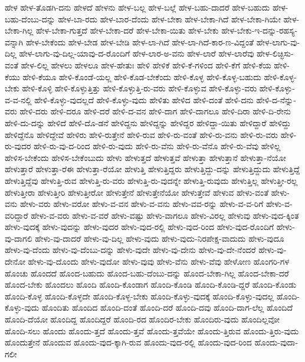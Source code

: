 {ಹೇಳ
ಹೇಳ-ತೊಡಗಿ-ದನು
ಹೇಳದೆ
ಹೇಳನು
ಹೇಳ-ಬಲ್ಲ
ಹೇಳ-ಬಲ್ಲೆ
ಹೇಳ-ಬಹು-ದಾದರೆ
ಹೇಳ-ಬಹುದು
ಹೇಳ-ಬಹು-ದೆಂಬು-ದನ್ನು
ಹೇಳ-ಬಾ-ರದು
ಹೇಳ-ಬಾರ-ದೆಂದು
ಹೇಳ-ಬೇಕಾ
ಹೇಳ-ಬೇಕಾ-ಗಿದೆ
ಹೇಳ-ಬೇಕಾ-ಗಿಯೇ
ಹೇಳ-ಬೇಕಾ-ಗಿಲ್ಲ
ಹೇಳ-ಬೇಕಾ-ಗುತ್ತದೆ
ಹೇಳ-ಬೇಕಾ-ದರೆ
ಹೇಳ-ಬೇಕಾ-ಯಿತು
ಹೇಳ-ಬೇಕು
ಹೇಳ-ಬೇಕು-ಇ-ದನ್ನು-ರಹಸ್ಯ-ವನ್ನಾಗಿ
ಹೇಳ-ಬೇಕೆಂದು
ಹೇಳ-ಬೇಡ
ಹೇಳ-ಬೇಡಿ
ಹೇಳ-ಲಾ-ಗಿದೆ
ಹೇಳ-ಲಾ-ಗಿದೆ-ಕಾರ-ಣ-ವಿದ್ದಂತೆ
ಹೇಳ-ಲಾಗು-ವು-ದಿಲ್ಲ
ಹೇಳ-ಲಾಗು-ವು-ದಿಲ್ಲ-ಯಾವು-ದ-ರೊಂದಿಗೆ
ಹೇಳ-ಲಾರ-ಅ-ವನು
ಹೇಳ-ಲಾರೆ
ಹೇಳ-ಲಾರೆವು
ಹೇಳ-ಲಿಚ್ಛಿಸು-ವಂತೆ
ಹೇಳ-ಲಿಲ್ಲ
ಹೇಳಲು
ಹೇಳಲೂ
ಹೇಳ-ಹೇತುಃ
ಹೇಳಿ
ಹೇಳಿಕೆ
ಹೇಳಿ-ಕೆ-ಗಳಿಂದ
ಹೇಳಿ-ಕೆಗೆ
ಹೇಳಿ-ಕೆಯ
ಹೇಳಿ-ಕೆಯು
ಹೇಳಿ-ಕೆಯೂ
ಹೇಳಿ-ಕೊಂಡೆ-ಯಲ್ಲ
ಹೇಳಿ-ಕೊಡ-ಬೇಕೆಂದು
ಹೇಳಿ-ಕೊಳ್ಳ
ಹೇಳಿ-ಕೊಳ್ಳ-ಬಹುದು
ಹೇಳಿ-ಕೊಳ್ಳ-ಬೇಕು
ಹೇಳಿ-ಕೊಳ್ಳಿ
ಹೇಳಿ-ಕೊಳ್ಳುತ್ತಿತ್ತು
ಹೇಳಿ-ಕೊಳ್ಳುತ್ತಿ-ರು-ವರು
ಹೇಳಿ-ಕೊಳ್ಳುವ
ಹೇಳಿ-ಕೊಳ್ಳು-ವರು
ಹೇಳಿ-ಕೊಳ್ಳು-ವ-ವ-ನಲ್ಲಿ
ಹೇಳಿ-ಕೊಳ್ಳು-ವುದಲ್ಲದೆ
ಹೇಳಿ-ಕೊಳ್ಳು-ವುದು
ಹೇಳಿತು
ಹೇಳಿದ
ಹೇಳಿ-ದಂತೆ
ಹೇಳಿ-ದನು
ಹೇಳಿ-ದ-ನೆನ್ನು-ವರು
ಹೇಳಿ-ದರು
ಹೇಳಿ-ದರೂ
ಹೇಳಿ-ದರೆ
ಹೇಳಿ-ದ-ವನ
ಹೇಳಿ-ದಾಗ
ಹೇಳಿ-ದಾಗಲೂ
ಹೇಳಿ-ದಿರಾ
ಹೇಳಿ-ದಿ-ರೇನು
ಹೇಳಿ-ದು-ದನ್ನು
ಹೇಳಿದೆ
ಹೇಳಿ-ದೊ-ಡನೆ
ಹೇಳಿದ್ದನು
ಹೇಳಿದ್ದನ್ನು
ಹೇಳಿದ್ದರ
ಹೇಳಿದ್ದಾ-ಯಿತು
ಹೇಳಿದ್ದಾರೆ
ಹೇಳಿದ್ದು
ಹೇಳಿದ್ದೆನೊ
ಹೇಳಿದ್ದೇವೆ
ಹೇಳಿರು
ಹೇಳಿ-ರುತ್ತೇನೆ
ಹೇಳಿ-ರುವ
ಹೇಳಿ-ರು-ವಂತೆ
ಹೇಳಿ-ರು-ವನು
ಹೇಳಿ-ರು-ವರು
ಹೇಳಿ-ರು-ವುದರ
ಹೇಳಿ-ರು-ವು-ದ-ರಿಂದ
ಹೇಳಿ-ರು-ವುದು
ಹೇಳಿ-ರು-ವೆನು
ಹೇಳಿ-ರು-ವೆನೊ
ಹೇಳಿ-ರು-ವೆವು
ಹೇಳಿಲ್ಲ
ಹೇಳಿಸ-ಬೇಕೆಂದು
ಹೇಳಿಸ-ಬೇಕೆಂಬುದು
ಹೇಳು
ಹೇಳುತ್ತದೆ
ಹೇಳುತ್ತವೆ
ಹೇಳುತ್ತಾ
ಹೇಳುತ್ತಾನೆ
ಹೇಳುತ್ತಾ-ನೆಯೋ
ಹೇಳುತ್ತಾರೆ
ಹೇಳುತ್ತಾ-ರೆಈ
ಹೇಳುತ್ತಾ-ರೆಯೋ
ಹೇಳುತ್ತಿ
ಹೇಳುತ್ತಿದ್ದರು
ಹೇಳುತ್ತಿದ್ದು-ದನ್ನು
ಹೇಳುತ್ತಿದ್ದುದು
ಹೇಳುತ್ತಿದ್ದೆ
ಹೇಳುತ್ತಿದ್ದೆವು
ಹೇಳುತ್ತಿ-ರುವ
ಹೇಳುತ್ತಿ-ರು-ವರು
ಹೇಳುತ್ತಿ-ರು-ವುದನ್ನೇ
ಹೇಳುತ್ತಿ-ರುವುದು
ಹೇಳುತ್ತಿಲ್ಲ
ಹೇಳುತ್ತೀ-ರಲ್ಲ
ಹೇಳುತ್ತೀರಾ
ಹೇಳುತ್ತೀರಿ
ಹೇಳುತ್ತೀರೋ
ಹೇಳುತ್ತೇನೆ
ಹೇಳುತ್ತೇನೆಯೋ
ಹೇಳುತ್ತೇವೆ
ಹೇಳುವ
ಹೇಳು-ವಂತೆ
ಹೇಳು-ವನು
ಹೇಳು-ವರು
ಹೇಳು-ವರೋ
ಹೇಳು-ವ-ವನ
ಹೇಳು-ವ-ವನು
ಹೇಳು-ವವ-ರನ್ನು
ಹೇಳು-ವ-ವ-ರಿಗೆ
ಹೇಳು-ವ-ವರಿದ್ದಾರೆ
ಹೇಳು-ವ-ವರು
ಹೇಳು-ವ-ವರೆ
ಹೇಳು-ವಷ್ಟು
ಹೇಳು-ವಾಗಲೂ
ಹೇಳು-ವಿರಲ್ಲ
ಹೇಳುವು
ಹೇಳು-ವುದ-ಕ್ಕಿಂತ
ಹೇಳು-ವುದಕ್ಕೆ
ಹೇಳು-ವುದನ್ನು
ಹೇಳು-ವುದರ
ಹೇಳು-ವುದ-ರಲ್ಲಿ
ಹೇಳು-ವುದ-ರಿಂದ
ಹೇಳು-ವುದ-ರೊಂದಿಗೆ
ಹೇಳು-ವು-ದಾಗಲಿ
ಹೇಳು-ವು-ದಾದರೆ
ಹೇಳು-ವು-ದಿಲ್ಲ
ಹೇಳು-ವುದು
ಹೇಳು-ವುದು-ನಿರಪೇಕ್ಷ-ವಾದುದು
ಹೇಳು-ವುದೂ
ಹೇಳು-ವು-ದೆಂದು
ಹೇಳು-ವು-ದೆಂಬು-ದನ್ನು
ಹೇಳು-ವುದೇ
ಹೇಳು-ವು-ದೇನು
ಹೇಳು-ವು-ದೇ-ನೆಂದರೆ
ಹೇಳು-ವು-ದೇನೋ
ಹೇಳು-ವು-ದೊಂದು
ಹೇಳು-ವುದೋ
ಹೇಳು-ವುವು
ಹೇಳು-ವೆನು
ಹೇಳು-ವೆವು
ಹೇಳೋಣ
ಹೊಂಗರಿ-ಗಳ
ಹೊಂಚು
ಹೊಂದದೆ
ಹೊಂದ-ಬಹುದು
ಹೊಂದ-ಬಹು-ದೆಂಬು-ದನ್ನು
ಹೊಂದ-ಬೇಕಾ-ಗಿಲ್ಲ
ಹೊಂದ-ಬೇಕಾ-ದರೆ
ಹೊಂದ-ಬೇಕು
ಹೊಂದಲು
ಹೊಂದಿ
ಹೊಂದಿ-ಕೊಂಡಾಗ
ಹೊಂದಿ-ಕೊಂಡಿ
ಹೊಂದಿ-ಕೊಂಡಿ-ದ್ದರೆ
ಹೊಂದಿ-ಕೊಂಡು
ಹೊಂದಿ-ಕೊಳ್ಳ
ಹೊಂದಿ-ಕೊಳ್ಳದೇ
ಹೊಂದಿ-ಕೊಳ್ಳ-ಬೇಕು
ಹೊಂದಿ-ಕೊಳ್ಳು-ವುದಕ್ಕೆ
ಹೊಂದಿ-ಕೊಳ್ಳು-ವುದಲ್ಲ
ಹೊಂದಿ-ಕೊಳ್ಳು-ವುದು
ಹೊಂದಿತು
ಹೊಂದಿದ
ಹೊಂದಿ-ದಂತೆ
ಹೊಂದಿ-ದರೆ
ಹೊಂದಿ-ದವು
ಹೊಂದಿ-ದಾಗ-ಲೆಲ್ಲ
ಹೊಂದಿದೆ
ಹೊಂದಿ-ದೆಯೋ
ಹೊಂದಿದ್ದ
ಹೊಂದಿದ್ದರೆ
ಹೊಂದಿ-ರದ
ಹೊಂದಿರ-ಬೇಕು
ಹೊಂದಿರು-ವುದು
ಹೊಂದಿಲ್ಲವೋ
ಹೊಂದಿ-ಸಲು
ಹೊಂದು
ಹೊಂದು-ತ್ತದೆ
ಹೊಂದು-ತ್ತವೆ
ಹೊಂದು-ತ್ತವೆಯೇ
ಹೊಂದು-ತ್ತಿರುವ
ಹೊಂದು-ತ್ತಿರು-ವುದು
ಹೊಂದುತ್ತೇನೆ
ಹೊಂದುವ
ಹೊಂದು-ವುದ-ಕ್ಕಾಗಿ-ರುವ
ಹೊಂದು-ವುದ-ರಲ್ಲಿ
ಹೊಂದು-ವುದ-ರಿಂದ
ಹೊಂದು-ವುದಾ-ಗಲೀ
}
